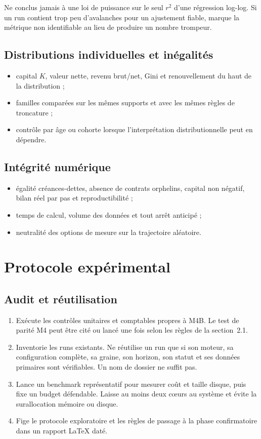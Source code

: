 \documentclass[11pt,a4paper]{article}
\begin{document}
Ne conclus jamais à une loi de puissance sur le seul $r^2$ d'une régression
log-log. Si un run contient trop peu d'avalanches pour un ajustement fiable,
marque la métrique non identifiable au lieu de produire un nombre trompeur.

\subsection{Distributions individuelles et inégalités}

\begin{itemize}
  \item capital $K$, valeur nette, revenu brut/net, Gini et renouvellement du
    haut de la distribution ;
  \item familles comparées sur les mêmes supports et avec les mêmes règles de
    troncature ;
  \item contrôle par âge ou cohorte lorsque l'interprétation
    distributionnelle peut en dépendre.
\end{itemize}

\subsection{Intégrité numérique}

\begin{itemize}
  \item égalité créances-dettes, absence de contrats orphelins, capital non
    négatif, bilan réel par pas et reproductibilité ;
  \item temps de calcul, volume des données et tout arrêt anticipé ;
  \item neutralité des options de mesure sur la trajectoire aléatoire.
\end{itemize}

\section{Protocole expérimental}

\subsection{Audit et réutilisation}

\begin{enumerate}
  \item Exécute les contrôles unitaires et comptables propres à M4B. Le test de
    parité M4 peut être cité ou lancé une fois selon les règles de la
    section~2.1.
  \item Inventorie les runs existants. Ne réutilise un run que si son moteur,
    sa configuration complète, sa graine, son horizon, son statut et ses
    données primaires sont vérifiables. Un nom de dossier ne suffit pas.
  \item Lance un benchmark représentatif pour mesurer coût et taille disque,
    puis fixe un budget défendable. Laisse au moins deux cœurs au système et
    évite la surallocation mémoire ou disque.
  \item Fige le protocole exploratoire et les règles de passage à la phase
    confirmatoire dans un rapport LaTeX daté.
\end{enumerate}
\end{document}
